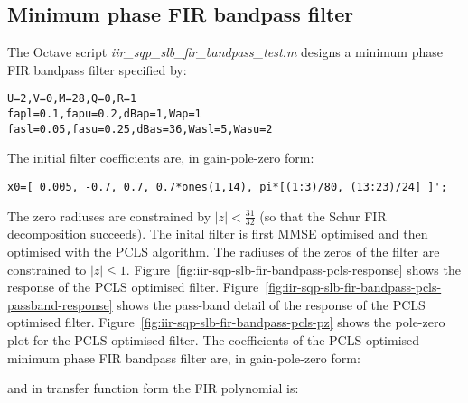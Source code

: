 \documentclass[a4paper,twoside,10pt,english]{report}
\begin{document}
\subsection{\label{sec:Minimum-phase-FIR-bandpass-filter}Minimum phase FIR bandpass filter}
The Octave script \emph{iir\_sqp\_slb\_fir\_bandpass\_test.m} designs a minimum
phase FIR bandpass filter specified by:
\begin{small}
\begin{verbatim}
U=2,V=0,M=28,Q=0,R=1
fapl=0.1,fapu=0.2,dBap=1,Wap=1
fasl=0.05,fasu=0.25,dBas=36,Wasl=5,Wasu=2
\end{verbatim}
\end{small}
The initial filter coefficients are, in gain-pole-zero form:
\begin{small}
\begin{verbatim}
x0=[ 0.005, -0.7, 0.7, 0.7*ones(1,14), pi*[(1:3)/80, (13:23)/24] ]';
\end{verbatim}
\end{small}
The zero radiuses are constrained by $\left|z\right|<\frac{31}{32}$ (so
that the Schur FIR decomposition succeeds).
The inital filter is first MMSE optimised and then optimised with the PCLS
algorithm.  The radiuses of the zeros of the filter are constrained to
$\left|z\right|\le1$.
Figure~\ref{fig:iir-sqp-slb-fir-bandpass-pcls-response} shows the response of
the PCLS optimised filter.
Figure~\ref{fig:iir-sqp-slb-fir-bandpass-pcls-passband-response} shows the
pass-band detail of the response of the PCLS optimised filter.
Figure~\ref{fig:iir-sqp-slb-fir-bandpass-pcls-pz} shows the pole-zero plot for
the PCLS optimised filter. The coefficients of the PCLS optimised minimum phase
FIR bandpass filter are, in gain-pole-zero form:
\begin{small}

\end{small}
and in transfer function form the FIR polynomial is:
\begin{small}

\end{small}
\end{document}
